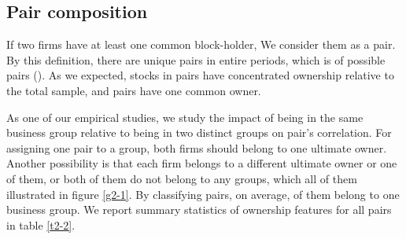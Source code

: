 \subsection{{Pair composition} }

	If two firms have at least one common block-holder, We consider them as a pair. By this definition, there are   unique pairs in entire periods, which is of possible pairs (). As we expected, stocks in pairs have concentrated ownership relative to the total sample, and pairs have one common owner.
	
	\normalcolor
	
	As one of our empirical studies, we study the impact of being in the same business group relative to being in two distinct groups on pair's correlation. 
	For assigning one pair to a group, both firms should belong to one ultimate owner. Another possibility is that each firm belongs to a different ultimate owner or one of them, or both of them do not belong to any groups, which all of them illustrated in figure \ref{g2-1}.
	By classifying pairs, on average, of them  belong to one business group. We report summary statistics of ownership features for all pairs in table \ref{t2-2}.
	
